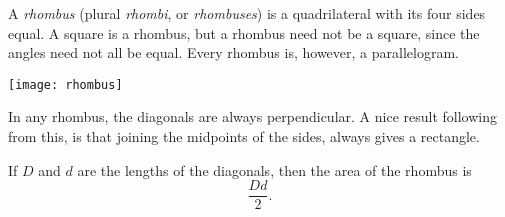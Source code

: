 \documentclass[12pt]{article}
\begin{document}
A \emph{rhombus} (plural \emph{rhombi}, or \emph{rhombuses})
is a quadrilateral with its four sides equal.
A square is a rhombus,
but a rhombus need not be a square,
since the angles need not all be equal.
Every rhombus is, however, a parallelogram.
\begin{center}
\texttt{[image: rhombus]}
\end{center}
In any rhombus, the diagonals are always perpendicular.
A nice result following from this,
is that joining the midpoints of the sides, always gives a rectangle.

If $D$ and $d$ are the lengths of the diagonals,
then the area of the rhombus is
\[
  \frac{Dd}{2}.
\]
\end{document}
